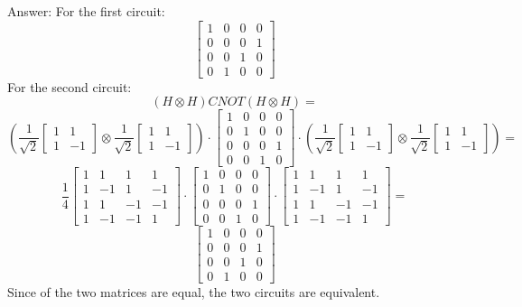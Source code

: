 \documentclass[11pt]{article}
\begin{document}
Answer:
For the first circuit:
$$
\begin{bmatrix}
1 & 0 & 0 & 0 \\
0 & 0 & 0 & 1 \\
0 & 0 & 1 & 0 \\
0 & 1 & 0 & 0
\end{bmatrix}
$$
For the second circuit:
$$
(H \otimes H)CNOT(H \otimes H) = 
$$
$$
\left(\frac{1}{\sqrt{2}}      
\begin{bmatrix}
1 & 1\\
1 & -1 
\end{bmatrix}
\otimes
\frac{1}{\sqrt{2}}
\begin{bmatrix}
1 & 1\\
1 & -1
\end{bmatrix}
\right)
\cdot
\begin{bmatrix}
1 & 0 & 0 & 0 \\
0 & 1 & 0 & 0 \\
0 & 0 & 0 & 1 \\
0 & 0 & 1 & 0
\end{bmatrix}
\cdot
\left(
\frac{1}{\sqrt{2}}      
\begin{bmatrix}
1 & 1\\
1 & -1 
\end{bmatrix}
\otimes
\frac{1}{\sqrt{2}}
\begin{bmatrix}
1 & 1\\
1 & -1
\end{bmatrix}
\right)
=
$$
$$
\frac{1}{4}
\begin{bmatrix}
1 & 1 & 1 & 1 \\
1 & -1 & 1 & -1 \\
1 & 1 & -1 & -1 \\
1 & -1 & -1 & 1
\end{bmatrix}
\cdot
\begin{bmatrix}
1 & 0 & 0 & 0 \\
0 & 1 & 0 & 0 \\
0 & 0 & 0 & 1 \\
0 & 0 & 1 & 0
\end{bmatrix}
\cdot
\begin{bmatrix}
    1 & 1 & 1 & 1 \\
    1 & -1 & 1 & -1 \\
    1 & 1 & -1 & -1 \\
    1 & -1 & -1 & 1
\end{bmatrix} = 
$$
$$
\begin{bmatrix}
    1 & 0 & 0 & 0 \\
    0 & 0 & 0 & 1 \\
    0 & 0 & 1 & 0 \\
    0 & 1 & 0 & 0
    \end{bmatrix}
$$
Since of the two matrices are equal, the two circuits are equivalent.
\end{document}
